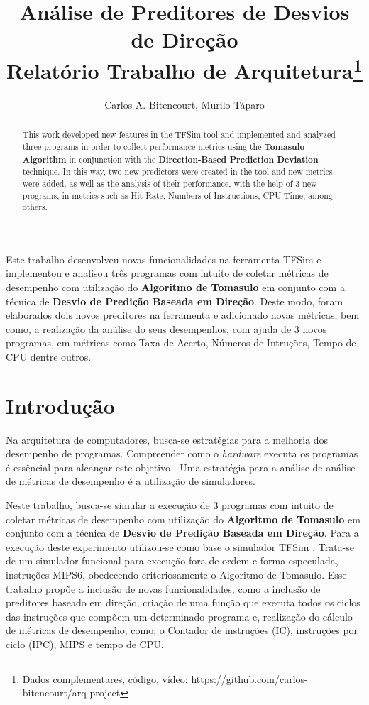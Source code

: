 \documentclass[12pt]{article}
\title{Análise de Preditores de Desvios de Direção\\ Relatório Trabalho de Arquitetura\footnote{Dados complementares, código, vídeo: https://github.com/carlos-bitencourt/arq-project}}
\author{Carlos A. Bitencourt\inst{1}, Murilo Táparo\inst{1}}
\begin{document}
\maketitle

\begin{abstract}
  This work developed new features in the TFSim tool and implemented and analyzed three programs in order to collect performance metrics using the \textbf{Tomasulo Algorithm} in conjunction with the \textbf{Direction-Based Prediction Deviation} technique. In this way, two new predictors were created in the tool and new metrics were added, as well as the analysis of their performance, with the help of 3 new programs, in metrics such as Hit Rate, Numbers of Instructions, CPU Time, among others.
\end{abstract}

\begin{resumo}
  Este trabalho desenvolveu novas funcionalidades na ferramenta TFSim e implementou e analisou três programas com intuito de coletar métricas de desempenho com utilização do \textbf{Algoritmo de Tomasulo} em conjunto com a  técnica de \textbf{Desvio de Predição Baseada em Direção}. Deste modo, foram elaborados dois novos preditores na ferramenta e adicionado novas métricas, bem como, a realização da análise do seus desempenhos, com ajuda de 3 novos programas, em métricas como Taxa de Acerto, Números de Intruções, Tempo de CPU dentre outros.

\end{resumo}

\section{Introdução}


Na arquitetura de computadores, busca-se estratégias para a melhoria dos desempenho de programas. Compreender como o \textit{hardware} executa os programas é essêncial para alcançar este objetivo \cite{patterson:2014}. Uma estratégia para a análise de análise de métricas de desempenho é a utilização de simuladores.

Neste trabalho, busca-se simular a execução de 3 programas com intuito de coletar métricas de desempenho com utilização do \textbf{Algoritmo de Tomasulo} em conjunto com a  técnica de \textbf{Desvio de Predição Baseada em Direção}. Para a execução deste experimento utilizou-se como base o simulador TFSim \cite{lucas:2019}. Trata-se de um simulador funcional para execução fora de ordem e forma especulada, instruções MIPS6, obedecendo criteriosamente o Algoritmo de Tomasulo. Esse trabalho propõe a inclusão de novas funcionalidades, como a inclusão de preditores baseado em direção, criação de uma função que executa todos os ciclos das instruções que compõem um determinado programa e, realização do cálculo de métricas de desempenho, como, o Contador de instruções (IC), instruções por ciclo (IPC), MIPS e tempo de CPU.
\end{document}

